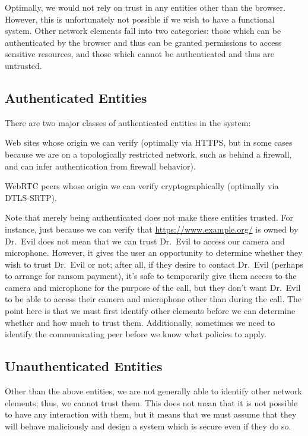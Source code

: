 \documentclass{article}
\begin{document}
Optimally, we would not rely on trust in any entities other than the
browser.  However, this is unfortunately not possible if we wish to
have a functional system.  Other network elements fall into two
categories: those which can be authenticated by the browser and thus
can be granted permissions to access sensitive resources, and those
which cannot be authenticated and thus are untrusted.

\subsection{Authenticated Entities}

There are two major classes of authenticated entities in the system:

\begin{description}[style=nextline]
\item[Calling services:] Web sites whose origin we can verify (optimally
  via HTTPS, but in some cases because we are on a topologically
  restricted network, such as behind a firewall, and can infer
  authentication from firewall behavior).

\item[Other users:] WebRTC peers whose origin we can verify
  cryptographically (optimally via DTLS-SRTP).
\end{description}

Note that merely being authenticated does not make these entities
trusted.  For instance, just because we can verify that
\url{https://www.example.org/} is owned by Dr.\ Evil does not mean that we
can trust Dr.\ Evil to access our camera and microphone.  However, it
gives the user an opportunity to determine whether they wish to trust
Dr.\ Evil or not; after all, if they desire to contact Dr.\ Evil
(perhaps to arrange for ransom payment), it's safe to temporarily
give them access to the camera and microphone for the purpose of the
call, but they don't want Dr.\ Evil to be able to access their camera
and microphone other than during the call.  The point here is that we
must first identify other elements before we can determine whether
and how much to trust them.  Additionally, sometimes we need to
identify the communicating peer before we know what policies to
apply.

\subsection{Unauthenticated Entities}

Other than the above entities, we are not generally able to identify
other network elements; thus, we cannot trust them.  This does not
mean that it is not possible to have any interaction with them, but
it means that we must assume that they will behave maliciously and
design a system which is secure even if they do so.
\end{document}
